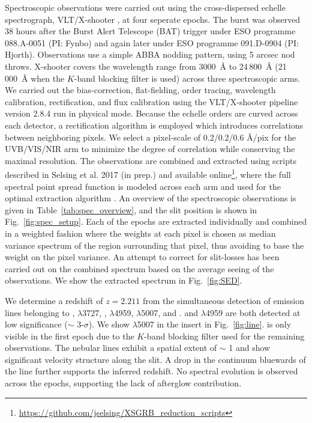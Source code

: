 \documentclass{aa}    %
\begin{document}
Spectroscopic observations were carried out using the cross-dispersed echelle
spectrograph, VLT/X-shooter \citep{Vernet2011}, at four seperate epochs. The
burst was observed 38 hours after the Burst Alert Telescope (BAT) trigger under
ESO programme 088.A-0051 (PI: Fynbo) and again later under ESO programme
091.D-0904 (PI: Hjorth). Observations use a simple ABBA nodding pattern, using 5
arcsec nod throws. X-shooter covers the wavelength range from 3000~\AA{} to
24\,800~\AA{} (21\,000~\AA{} when the $K$-band blocking filter is used) across
three spectroscopic arms. We carried out the bias-correction, flat-fielding,
order tracing, wavelength calibration, rectification, and flux calibration using
the VLT/X-shooter pipeline version 2.8.4 \citep{Goldoni2006, Modigliani2010} run
in physical mode. Because the echelle orders are curved across each detector, a
rectification algorithm is employed which introduces correlations between
neighboring pixels. We select a pixel-scale of 0.2/0.2/0.6 \AA/pix for the
UVB/VIS/NIR arm to minimize the degree of correlation while conserving the
maximal resolution. The observations are combined and extracted using scripts
described in Selsing et al. 2017 (in prep.) and available
online\footnote{\url{https://github.com/jselsing/XSGRB_reduction_scripts}},
where the full spectral point spread function is modeled across each arm and
used for the optimal extraction algorithm \citep{Horne1986}. An overview of the
spectroscopic observations is given in Table~\ref{tab:spec_overview}, and the
slit position is shown in Fig.~\ref{fig:spec_setup}. Each of the epochs are
extracted individually and combined in a weighted fashion where the weights at
each pixel is chosen as median variance spectrum of the region surrounding that
pixel, thus avoiding to base the weight on the pixel variance. An attempt to
correct for slit-losses has been carried out on the combined spectrum based on
the average seeing of the observations. We show the extracted spectrum in
Fig.~\ref{fig:SED}.



We determine a redshift of $z = 2.211$ from the simultaneous detection of
emission lines belonging to \lya, \oii$\lambda$3727, \hb, \oiii$\lambda$4959,
\oiii$\lambda$5007, and \ha. \hb{} and \oiii$\lambda$4959 are both detected at
low significance ($\sim$ 3-$\sigma$). We show \oiii$\lambda$5007 in the insert
in Fig.~\ref{fig:line}.  \ha{} is only visible in the first epoch due to the
$K$-band blocking filter used for the remaining observations. The nebular lines
exhibit a spatial extent of $\sim$ 1 and show significant velocity
structure along the slit. A drop in the continuum bluewards of the \lya{} line
further supports the inferred redshift. No spectral evolution is observed across
the epochs, supporting the lack of afterglow contribution.
\end{document}
